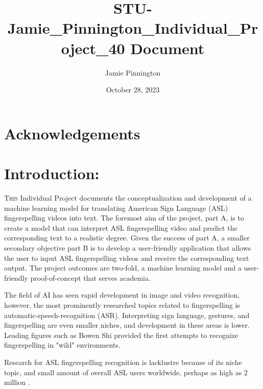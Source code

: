 \documentclass[preprint,11pt,review,authoryear]{elsarticle}
\title{STU-Jamie_Pinnington_Individual_Project_40 Document}
\author{Jamie Pinnington}
\date{October 28, 2023}
\begin{document}
\pagestyle{customStyle} %



\clearpage %

\begin{abstract}
\end{abstract}

\section{Acknowledgements}

\clearpage %

\tableofcontents
\clearpage %

\listoffigures
\clearpage %

\listoftables
\clearpage %

\section{Introduction:}

\lettrine[lines=2]{T}{his} Individual Project documents the conceptualization and development of a machine learning model for translating American Sign Language (ASL) fingerspelling videos into text. The foremost aim of the project, part A, is to create a model that can interpret ASL fingerspelling video and predict the corresponding text to a realistic degree. Given the success of part A, a smaller secondary objective part B is to develop a user-friendly application that allows the user to input ASL fingerspelling videos and receive the corresponding text output. The project outcomes are two-fold, a machine learning model and a user-friendly proof-of-concept that serves academia.

The field of AI has seen rapid development in image and video recognition, however, the most prominently researched topics related to fingerspelling is automatic-speech-recognition (ASR). Interpreting sign language, gestures, and fingerspelling are even smaller niches, and development in these areas is lower. Leading figures such as Bowen Shi \cite{shiFingerspellingDetectionAmerican2021} provided the first attempts to recognize fingerspelling in "wild" environments.

Research for ASL fingerspelling recognition is lacklustre because of its niche topic, and small amount of overall ASL users worldwide, perhaps as high as 2 million \cite{mitchellHowManyPeople2006, ethnologueAmericanSignLanguage2023}. 
\end{document}

